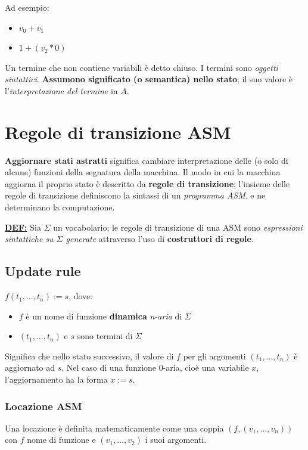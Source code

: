 \noindent Ad esempio:
\begin{itemize}
    \item $v_0 + v_1$
    \item $1 + (v_2 * 0)$
\end{itemize}

\noindent Un termine che non contiene variabili è detto chiuso. I termini 
sono \textit{oggetti sintattici}. \textbf{Assumono significato (o semantica)
nello stato}; il suo valore è l'\textit{interpretazione del termine} in $A$.

\newpage
\section{Regole di transizione ASM}
\textbf{Aggiornare stati astratti} significa cambiare interpretazione delle 
(o solo di alcune) funzioni della segnatura della macchina. Il modo in cui la macchina 
aggiorna il proprio stato è descritto da \textbf{regole di transizione}; l'insieme 
delle regole di transizione definiscono la sintassi di un \textit{programma ASM}.
e ne determinano la computazione.

\noindent \underline{\textbf{DEF:}} Sia $\Sigma$ un vocabolario; le regole 
di transizione di una ASM sono \textit{espressioni sintattiche su $\Sigma$ generate} attraverso 
l'uso di \textbf{costruttori di regole}.

\subsection{Update rule}

$f(t_1, \dots, t_n) := s$, dove:
\begin{itemize}
    \item $f$ è un nome di funzione \textbf{dinamica} \textit{n-aria} di $\Sigma$
    \item $(t_1, \dots, t_n)$ e $s$ sono termini di $\Sigma$
\end{itemize}

\noindent Significa che nello stato successivo, il valore di $f$ per gli 
argomenti $(t_1, \dots, t_n)$ è aggiornato ad $s$. Nel caso di una funzione 0-aria, 
cioè una variabile $x$, l'aggiornamento ha la forma $x := s$.


\subsubsection{Locazione ASM}
Una locazione è definita matematicamente come una coppia $(f, (v_1, \dots, v_n))$ con 
$f$ nome di funzione e $(v_1, \dots, v_2)$ i suoi argomenti.

